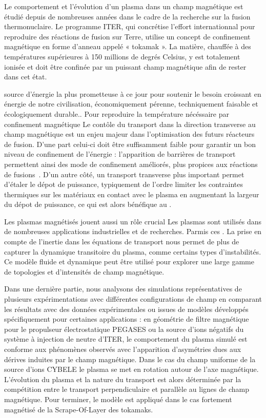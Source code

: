 
\begin{refsection}

Le comportement et l'évolution d'un plasma dans un champ
magnétique est étudié depuis de nombreuses années dans le cadre de la recherche
sur la fusion thermonuclaire. Le programme ITER, qui concrétise l'effort
internationnal pour reproduire des réactions de fusion sur Terre, utilise un
concept de confinement magnétique en forme d'anneau appelé « tokamak ». La
matière, chauffée à des températures supérieures à 150 millions de degrés
Celsius, y est totalement ionisée et doit être confinée par un puissant champ
magnétique afin de rester dans cet état.




source
d'énergie la plus prometteuse à ce jour pour soutenir le besoin croissant en énergie de notre civilisation,
économiquement pérenne, techniquement faisable et écologiquement durable.. Pour
reproduire la température nécéssaire par confinement magnétique Le contôle du
transport dans la direction transverse au champ magnétique est un enjeu majeur
dans l'optimisation des futurs réacteurs de fusion. D'une part celui-ci doit
être suffisamment faible pour garantir un bon niveau de confinement de l'énergie
: l'apparition de barrières de transport permettent ainsi des mode de
confinement améliorés, plus propices aux réactions de
fusions~\parencite{GarbetBarriere,Ghendrih}. D'un autre côté, un transport
transverse plus important permet d'étaler le dépot de puissance, typiquement de
l'ordre  limiter les contraintes thermiques sur les matériaux en contact avec
le plasma en augmentant la largeur du dépot de puissance, ce qui est alors
bénéfique au .

	Les plasmas magnétisés jouent aussi un rôle crucial Les plasmas sont utilisés
	dans de nombreuses applications industrielles et de recherches. Parmis ces .  La prise en compte de l'inertie
	dans les équations de transport nous permet de plus de capturer la dynamique transitoire du plasma, comme certains types d'instabilités. Ce modèle fluide et dynamique peut être utilisé pour explorer
		une large gamme de topologies et d'intensités de champ magnétique.
				
		
		Dans une dernière partie, nous analysons des simulations représentatives de
		plusieurs expérimentations avec différentes configurations de champ en comparant
		les résultats avec des données expérimentales ou issues de modèles développés
		spécifiquement pour certaines applications :
		en géométrie de filtre magnétique pour le propulseur électrostatique PEGASES
		ou la source d'ions négatifs du système à injection de neutre d'ITER, le
		comportement du plasma simulé est conforme aux phénomènes observés avec
		l’apparition d’asymétries dues aux dérives induites par le champ magnétique.
		Dans le cas du champ uniforme de la source d'ions CYBELE le plasma se met en
		rotation autour de l'axe magnétique. L'évolution du plasma et la nature du
		transport est alors déterminée par la compétition entre le transport
		perpendiculaire et parallèle au lignes de champ magnétique. Pour terminer, le
		modèle est appliqué dans le cas fortement magnétisé de la Scrape-Of-Layer des
		tokamaks.
		

\end{refsection}
